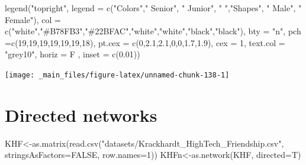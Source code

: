 \documentclass[
  notitlepage,
  onecolumn,
  openany]{book}
\newenvironment{Shaded}{\begin{snugshade}}{\end{snugshade}}
\newcommand{\AttributeTok}[1]{\textcolor[rgb]{0.77,0.63,0.00}{#1}}
\newcommand{\ConstantTok}[1]{\textcolor[rgb]{0.00,0.00,0.00}{#1}}
\newcommand{\DecValTok}[1]{\textcolor[rgb]{0.00,0.00,0.81}{#1}}
\newcommand{\FloatTok}[1]{\textcolor[rgb]{0.00,0.00,0.81}{#1}}
\newcommand{\FunctionTok}[1]{\textcolor[rgb]{0.00,0.00,0.00}{#1}}
\newcommand{\NormalTok}[1]{#1}
\newcommand{\OtherTok}[1]{\textcolor[rgb]{0.56,0.35,0.01}{#1}}
\newcommand{\StringTok}[1]{\textcolor[rgb]{0.31,0.60,0.02}{#1}}
\begin{document}
\begin{Shaded}
\begin{Highlighting}[]
\FunctionTok{legend}\NormalTok{(}\StringTok{"topright"}\NormalTok{,}
       \AttributeTok{legend =} \FunctionTok{c}\NormalTok{(}\StringTok{"Colors"}\NormalTok{,}\StringTok{" Senior"}\NormalTok{, }\StringTok{" Junior"}\NormalTok{, }\StringTok{" "}\NormalTok{,}\StringTok{"Shapes"}\NormalTok{, }\StringTok{" Male"}\NormalTok{, }\StringTok{" Female"}\NormalTok{),}
       \AttributeTok{col =} \FunctionTok{c}\NormalTok{(}\StringTok{"white"}\NormalTok{,}\StringTok{"\#B78FB3"}\NormalTok{,}\StringTok{"\#22BFAC"}\NormalTok{,}\StringTok{"white"}\NormalTok{,}\StringTok{"white"}\NormalTok{,}\StringTok{"black"}\NormalTok{,}\StringTok{"black"}\NormalTok{), }
       \AttributeTok{bty =} \StringTok{"n"}\NormalTok{, }
       \AttributeTok{pch =}\FunctionTok{c}\NormalTok{(}\DecValTok{19}\NormalTok{,}\DecValTok{19}\NormalTok{,}\DecValTok{19}\NormalTok{,}\DecValTok{19}\NormalTok{,}\DecValTok{19}\NormalTok{,}\DecValTok{19}\NormalTok{,}\DecValTok{18}\NormalTok{),}
       \AttributeTok{pt.cex =} \FunctionTok{c}\NormalTok{(}\DecValTok{0}\NormalTok{,}\FloatTok{2.1}\NormalTok{,}\FloatTok{2.1}\NormalTok{,}\DecValTok{0}\NormalTok{,}\DecValTok{0}\NormalTok{,}\FloatTok{1.7}\NormalTok{,}\FloatTok{1.9}\NormalTok{), }
       \AttributeTok{cex =} \DecValTok{1}\NormalTok{, }
       \AttributeTok{text.col =} \StringTok{"grey10"}\NormalTok{, }
       \AttributeTok{horiz =}\NormalTok{ F , }
       \AttributeTok{inset =} \FunctionTok{c}\NormalTok{(}\FloatTok{0.01}\NormalTok{))}
\end{Highlighting}
\end{Shaded}

\begin{center}\texttt{[image: \_main\_files/figure-latex/unnamed-chunk-138-1]} \end{center}

\hypertarget{directed-networks}{%
\section{Directed networks}\label{directed-networks}}

\begin{Shaded}
\begin{Highlighting}[]
\NormalTok{KHF}\OtherTok{\textless{}{-}}\FunctionTok{as.matrix}\NormalTok{(}\FunctionTok{read.csv}\NormalTok{(}\StringTok{"datasets/Krackhardt\_HighTech\_Friendship.csv"}\NormalTok{,}
                        \AttributeTok{stringsAsFactors=}\ConstantTok{FALSE}\NormalTok{, }\AttributeTok{row.names=}\DecValTok{1}\NormalTok{))}
\NormalTok{KHFn}\OtherTok{\textless{}{-}}\FunctionTok{as.network}\NormalTok{(KHF, }\AttributeTok{directed=}\NormalTok{T)}
\end{Highlighting}
\end{Shaded}
\end{document}
